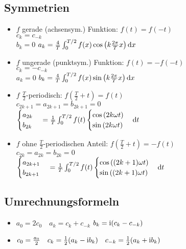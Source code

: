 \documentclass[german,color]{latex4ei/latex4ei_fs}
\begin{document}
\begin{sectionbox}
	\subsection{Symmetrien}
	\begin{itemize}
		\item $f$ gerade (achsensym.) Funktion: $f(t) = f(-t)$\\
		$c_k = c_{-k}$\\
		$b_k = 0$ \qquad $a_k = \frac{4}{T} \int_{0}^{T/2} f(x) \cos \left(k \frac{2\pi}{T} x \right) \diff x$
		\item $f$ ungerade (punktsym.) Funktion: $f(t) = -f(-t)$\\
		$c_k = -c_{-k}$\\
		$a_k = 0$ \qquad $ b_k = \frac{4}{T} \int_{0}^{T/2} f(x) \sin \left(k \frac{2\pi}{T} x \right) \diff x$
		\item $f$ $\frac{T}{2}$-periodisch: $f(\frac{T}{2} + t) = f(t)$\\
		$c_{2k+1} = a_{2k+1} = b_{2k+1} = 0$\\
		$\begin{cases} a_{2k}\\ b_{2k} \end{cases} = \frac{1}{T}\int_0^{T/2}f(t)\begin{cases} \cos{(2k \omega t)}\\ \sin{(2k \omega t)} \end{cases} \diff t$
		\item $f$ ohne $\frac{T}{2}$-periodischen Anteil: $f(\frac{T}{2} + t) = -f(t)$\\
		$c_{2k} = a_{2k} = b_{2k} = 0$\\
		$\begin{cases} a_{2k+1}\\ b_{2k+1} \end{cases} = \frac{1}{T}\int_0^{T/2}f(t)\begin{cases} \cos{((2k+1) \omega t)}\\ \sin{((2k+1) \omega t)} \end{cases} \diff t$
	\end{itemize}
\end{sectionbox}

\begin{sectionbox}
	\subsection{Umrechnungsformeln}
	\begin{itemize}
		\item $a_0 = 2 c_0 \quad a_k = c_k + c_{-k}$  \quad $b_k = \mathrm{i} (c_k - c_{-k})$
		\item $c_0 = \frac{a_0}{2} \quad c_k = \frac12(a_k - \mathrm{i} b_k) \quad c_{-k} = \frac12(a_k + \mathrm{i} b_k)$
	\end{itemize}
\end{sectionbox}
\end{document}
